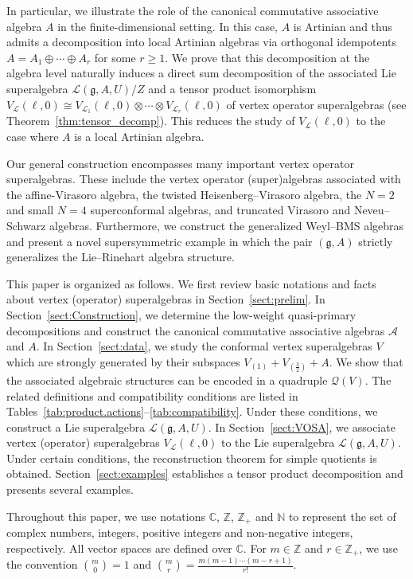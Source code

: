 \documentclass[12pt]{article}
\numberwithin{equation}{section}
\theoremstyle{definition}
\theoremstyle{plain}
\newcommand{\bC}{\ensuremath{\mathbb{C}}}
\newcommand{\bN}{\ensuremath{\mathbb{N}}}
\newcommand{\bZ}{\ensuremath{\mathbb{Z}}}
\newcommand{\fg}{\mathfrak{g}}
\newcommand{\cA}{\ensuremath{\mathcal{A}}}
\newcommand{\cQ}{\ensuremath{\mathcal{Q}}}
\newcommand{\cL}{\ensuremath{\mathcal{L}}}
\begin{document}
In particular, we illustrate the role of the canonical commutative associative algebra $A$ in the finite-dimensional setting. In this case, $A$ is Artinian and thus admits a decomposition into local Artinian algebras via orthogonal idempotents $A=A_1\oplus\cdots\oplus A_r$ for some $r\ge1$. We prove that this decomposition at the algebra level naturally induces a direct sum decomposition of the associated Lie superalgebra $\cL(\fg,A,U)/Z$ and a tensor product isomorphism $V_{\cL}(\ell,0)\cong V_{\cL_1}(\ell,0)\otimes\cdots\otimes V_{\cL_r}(\ell,0)$ of vertex operator superalgebras (see Theorem~\ref{thm:tensor_decomp}). This reduces the study of $V_{\cL}(\ell,0)$ to the case where $A$ is a local Artinian algebra.

Our general construction encompasses many important vertex operator superalgebras. These include the vertex operator (super)algebras associated with the affine-Virasoro algebra, the twisted Heisenberg--Virasoro algebra, the $N=2$ and small $N=4$ superconformal algebras, and truncated Virasoro and Neveu--Schwarz algebras. Furthermore, we construct the generalized Weyl--BMS algebras and present a novel supersymmetric example in which the pair $(\fg,A)$ strictly generalizes the Lie--Rinehart algebra structure.

This paper is organized as follows. We first review basic notations and facts about vertex (operator) superalgebras in Section~\ref{sect:prelim}. In Section~\ref{sect:Construction}, we determine the low-weight quasi-primary decompositions and construct the canonical commutative associative algebras $\cA$ and $A$. In Section~\ref{sect:data}, we study the conformal vertex superalgebras $V$ which are strongly generated by their subspaces $V_{(1)}+V_{(\frac{3}{2})}+A$. We show that the associated algebraic structures can be encoded in a quadruple $\cQ(V)$. The related definitions and compatibility conditions are listed in Tables~\ref{tab:product.actions}--\ref{tab:compatibility}. Under these conditions, we construct a Lie superalgebra $\cL(\fg,A,U)$. In Section~\ref{sect:VOSA}, we associate vertex (operator) superalgebras $V_\cL(\ell,0)$ to the Lie superalgebra $\cL(\fg,A,U)$. Under certain conditions, the reconstruction theorem for simple quotients is obtained. Section~\ref{sect:examples} establishes a tensor product decomposition and presents several examples.


Throughout this paper, we use notations $\bC$, $\bZ$, $\bZ_+$ and $\bN$ to represent the set of complex numbers, integers, positive integers and non-negative integers, respectively. All vector spaces are defined over $\bC$. For $m\in\bZ$ and $r\in\bZ_+$, we use the convention $\binom{m}{0}=1$ and $\binom{m}{r}=\frac{m(m-1)\cdots(m-r+1)}{r!}$.
\end{document}
